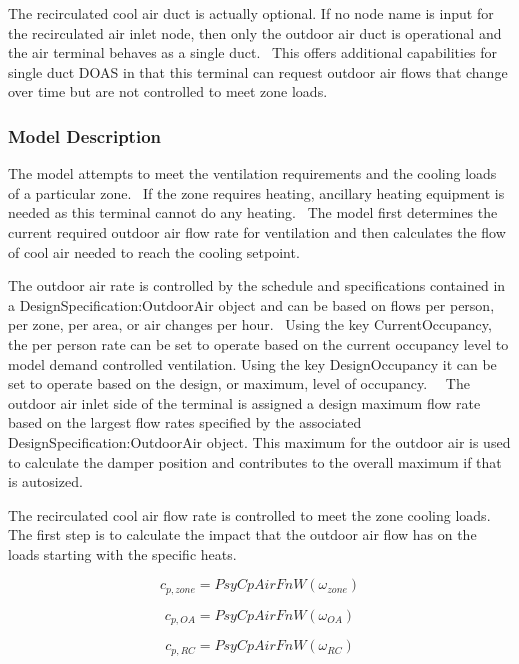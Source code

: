 The recirculated cool air duct is actually optional. If no node name is input for the recirculated air inlet node, then only the outdoor air duct is operational and the air terminal behaves as a single duct.~ This offers additional capabilities for single duct DOAS in that this terminal can request outdoor air flows that change over time but are not controlled to meet zone loads.

\subsubsection{Model Description}\label{model-description-4-000}

The model attempts to meet the ventilation requirements and the cooling loads of a particular zone.~ If the zone requires heating, ancillary heating equipment is needed as this terminal cannot do any heating.~ The model first determines the current required outdoor air flow rate for ventilation and then calculates the flow of cool air needed to reach the cooling setpoint.

The outdoor air rate is controlled by the schedule and specifications contained in a DesignSpecification:OutdoorAir object and can be based on flows per person, per zone, per area, or air changes per hour.~ Using the key CurrentOccupancy, the per person rate can be set to operate based on the current occupancy level to model demand controlled ventilation. Using the key DesignOccupancy it can be set to operate based on the design, or maximum, level of occupancy.~~ The outdoor air inlet side of the terminal is assigned a design maximum flow rate based on the largest flow rates specified by the associated DesignSpecification:OutdoorAir object. This maximum for the outdoor air is used to calculate the damper position and contributes to the overall maximum if that is autosized.

The recirculated cool air flow rate is controlled to meet the zone cooling loads.~ The first step is to calculate the impact that the outdoor air flow has on the loads starting with the specific heats.

\begin{equation}
{c_{p,zone}} = PsyCpAirFnW\left( {{\omega_{zone}}} \right)
\end{equation}

\begin{equation}
{c_{p,OA}} = PsyCpAirFnW\left( {{\omega_{OA}}} \right)
\end{equation}

\begin{equation}
{c_{p,RC}} = PsyCpAirFnW\left( {{\omega_{RC}}} \right)
\end{equation}


